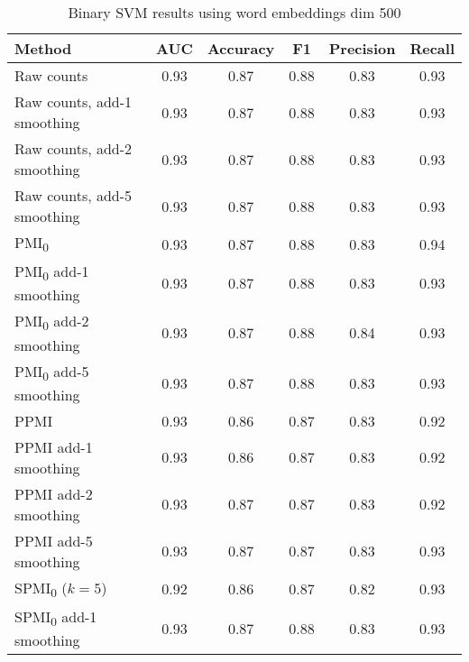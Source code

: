 \documentclass{article}
\begin{document}
\begin{table}[htp]
 \caption{Binary SVM results using word embeddings dim 500}
  \centering
  \begin{tabular}{|l|c|c|c|c|c|}
    \hline
    \rowcolor{lightgray} \textbf{Method} & \textbf{AUC} & \textbf{Accuracy} & \textbf{F1} & \textbf{Precision} & \textbf{Recall} \\
    \hline
    Raw counts & \cellcolor{green} 0.93 & \cellcolor{green} 0.87 & \cellcolor{green} 0.88 & 0.83 & 0.93 \\
    \hline
    Raw counts, add-1 smoothing & \cellcolor{green} 0.93 & \cellcolor{green} 0.87 & \cellcolor{green} 0.88 & 0.83 & 0.93 \\
    \hline
    Raw counts, add-2 smoothing & \cellcolor{green} 0.93 & \cellcolor{green} 0.87 & \cellcolor{green} 0.88 & 0.83 & 0.93 \\
    \hline
    Raw counts, add-5 smoothing & \cellcolor{green} 0.93 & \cellcolor{green} 0.87 & \cellcolor{green} 0.88 & 0.83 & 0.93 \\
    \hline
    \cellcolor{green} PMI\textsubscript{0} & \cellcolor{green} 0.93 & \cellcolor{green} 0.87 & \cellcolor{green} 0.88 & 0.83 & \cellcolor{green} 0.94 \\
    \hline
    PMI\textsubscript{0} add-1 smoothing & \cellcolor{green} 0.93 & \cellcolor{green} 0.87 & \cellcolor{green} 0.88 & 0.83 & 0.93 \\
    \hline
    \cellcolor{green} PMI\textsubscript{0} add-2 smoothing & \cellcolor{green} 0.93 & \cellcolor{green} 0.87 & \cellcolor{green} 0.88 & \cellcolor{green} 0.84 & 0.93 \\
    \hline
    PMI\textsubscript{0} add-5 smoothing & \cellcolor{green} 0.93 & \cellcolor{green} 0.87 & \cellcolor{green} 0.88 & 0.83 & 0.93 \\
    \hline
    PPMI & \cellcolor{green} 0.93 & 0.86 & 0.87 & 0.83 & 0.92 \\
    \hline
    PPMI add-1 smoothing & \cellcolor{green} 0.93 & 0.86 & 0.87 & 0.83 & 0.92 \\
    \hline
    PPMI add-2 smoothing & \cellcolor{green} 0.93 & \cellcolor{green} 0.87 & 0.87 & 0.83 & 0.92 \\
    \hline
    PPMI add-5 smoothing & \cellcolor{green} 0.93 & \cellcolor{green} 0.87 & 0.87 & 0.83 & 0.93 \\
    \hline
    SPMI\textsubscript{0} ($k=5$) & 0.92 & 0.86 & 0.87 & 0.82 & 0.93 \\
    \hline
    SPMI\textsubscript{0} add-1 smoothing & \cellcolor{green} 0.93 & \cellcolor{green} 0.87 & \cellcolor{green} 0.88 & 0.83 & 0.93 \\

\end{tabular}
\end{table}
\end{document}
